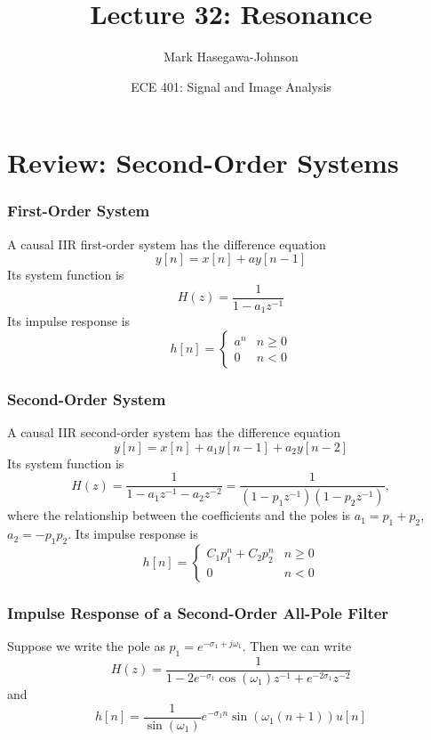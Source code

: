 \documentclass{beamer}
\title{Lecture 32: Resonance}
\author{Mark Hasegawa-Johnson}
\date{ECE 401: Signal and Image Analysis}
\begin{document}
\begin{frame}
  \maketitle
\end{frame}

\begin{frame}
  \tableofcontents
\end{frame}

\section[Review]{Review: Second-Order Systems}
\setcounter{subsection}{1}

\begin{frame}
  \frametitle{First-Order System}

  A causal IIR first-order system has the difference equation
  \[
  y[n] = x[n] + a y[n-1]
  \]
  Its system function is
  \[
  H(z) = \frac{1}{1-a_1z^{-1}}
  \]
  Its impulse response is
  \[
  h[n] = \left\{\begin{array}{ll}
  a^n & n \ge 0\\
  0 &  n < 0
  \end{array}\right.
  \]
\end{frame}

\begin{frame}
  \frametitle{Second-Order System}

  A causal IIR second-order system has the difference equation
  \[
  y[n] = x[n] + a_1 y[n-1] + a_2 y[n-2]
  \]
  Its system function is
  \[
  H(z) = \frac{1}{1-a_1z^{-1}-a_2z^{-2}}
  = \frac{1}{(1-p_1z^{-1})(1-p_2z^{-1})},
  \]
  where the relationship between the coefficients and the poles is
  $a_1=p_1+p_2$, $a_2=-p_1p_2$.  Its impulse response is
  \[
  h[n] =\left\{\begin{array}{ll}
  C_1 p_1^n  + C_2 p_2^n & n \ge 0\\
  0 & n < 0
  \end{array}\right.
  \]
\end{frame}

\begin{frame}
  \frametitle{Impulse Response of a Second-Order All-Pole Filter}

  Suppose we write the pole as $p_1=e^{-\sigma_1+j\omega_1}$.  Then we can write
  \[
  H(z) = \frac{1}{1-2e^{-\sigma_1}\cos(\omega_1)z^{-1}+ e^{-2\sigma_1}z^{-2}}
  \]
  and
  \[
  h[n] = \frac{1}{\sin(\omega_1)} e^{-\sigma_1n}\sin(\omega_1(n+1)) u[n]
  \]
\end{frame}
\end{document}
